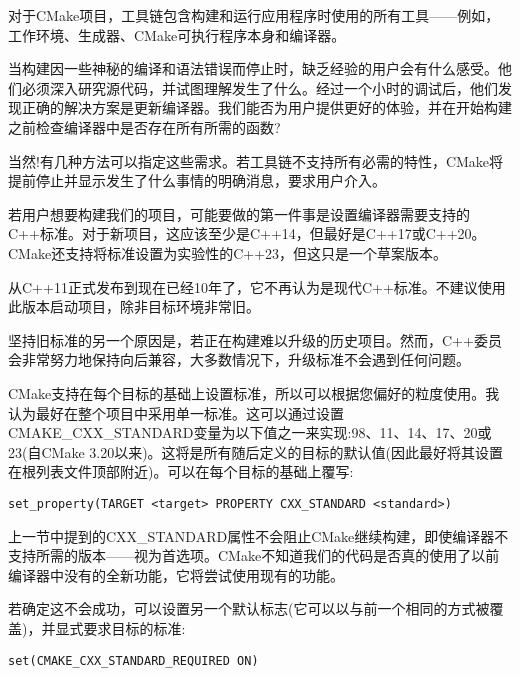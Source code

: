 
对于CMake项目，工具链包含构建和运行应用程序时使用的所有工具——例如，工作环境、生成器、CMake可执行程序本身和编译器。

当构建因一些神秘的编译和语法错误而停止时，缺乏经验的用户会有什么感受。他们必须深入研究源代码，并试图理解发生了什么。经过一个小时的调试后，他们发现正确的解决方案是更新编译器。我们能否为用户提供更好的体验，并在开始构建之前检查编译器中是否存在所有所需的函数?

当然!有几种方法可以指定这些需求。若工具链不支持所有必需的特性，CMake将提前停止并显示发生了什么事情的明确消息，要求用户介入。


若用户想要构建我们的项目，可能要做的第一件事是设置编译器需要支持的C++标准。对于新项目，这应该至少是C++14，但最好是C++17或C++20。CMake还支持将标准设置为实验性的C++23，但这只是一个草案版本。

\begin{tcolorbox}[colback=blue!5!white,colframe=blue!75!black,title=Note]
从C++11正式发布到现在已经10年了，它不再认为是现代C++标准。不建议使用此版本启动项目，除非目标环境非常旧。

坚持旧标准的另一个原因是，若正在构建难以升级的历史项目。然而，C++委员会非常努力地保持向后兼容，大多数情况下，升级标准不会遇到任何问题。
\end{tcolorbox}

CMake支持在每个目标的基础上设置标准，所以可以根据您偏好的粒度使用。我认为最好在整个项目中采用单一标准。这可以通过设置CMAKE\_CXX\_STANDARD变量为以下值之一来实现:98、11、14、17、20或23(自CMake 3.20以来)。这将是所有随后定义的目标的默认值(因此最好将其设置在根列表文件顶部附近)。可以在每个目标的基础上覆写:


\begin{lstlisting}[style=styleCMake]
set_property(TARGET <target> PROPERTY CXX_STANDARD <standard>)
\end{lstlisting}


上一节中提到的CXX\_STANDARD属性不会阻止CMake继续构建，即使编译器不支持所需的版本——视为首选项。CMake不知道我们的代码是否真的使用了以前编译器中没有的全新功能，它将尝试使用现有的功能。

若确定这不会成功，可以设置另一个默认标志(它可以以与前一个相同的方式被覆盖)，并显式要求目标的标准:

\begin{lstlisting}[style=styleCMake]
set(CMAKE_CXX_STANDARD_REQUIRED ON)
\end{lstlisting}

